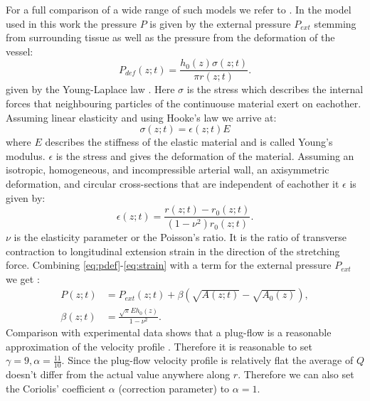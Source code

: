 \documentclass[a4paper, oneside]{discothesis}
\begin{document}
For a full comparison of a wide range of such models we refer to \cite{gomez2017analysis}.
In the model used in this work the pressure $P$ is given by the external pressure $P_{ext}$ stemming from surrounding tissue as well as the pressure from the deformation of the vessel:
\begin{equation}
	P_{def}(z;t) = \frac{h_0(z) \sigma(z;t)}{\pi r(z;t)}. \label{eq:pdef}
\end{equation}
given by the Young-Laplace law \cite{laplace1805traité} \cite{young1804essay}.
Here $\sigma$ is the stress which describes the internal forces that neighbouring particles of the continuouse material exert on eachother.
Assuming linear elasticity and using Hooke's law \cite{hooke1678lectures} we arrive at:
\begin{equation}
	\sigma(z;t) = \epsilon(z;t) E \label{eq:stress}
\end{equation}
where $E$ describes the stiffness of the elastic material and is called Young's modulus.
$\epsilon$ is the stress and gives the deformation of the material.
Assuming an isotropic, homogeneous, and incompressible arterial wall, an axisymmetric deformation, and circular cross-sections that are independent of eachother it $\epsilon$ is given by:
\begin{equation}
	\epsilon(z;t) = \frac{r(z;t)-r_0(z;t)}{ (1-\nu^2) r_0(z;t)}. \label{eq:strain}
\end{equation}
$\nu$ is the elasticity parameter or the Poisson's ratio.
It is the ratio of transverse contraction to longitudinal extension strain in the direction of the stretching force.
Combining \autoref{eq:pdef}-\autoref{eq:strain} with a term for the external pressure $P_{ext}$ we get \cite{sherwin2003one} \cite{sherwin2003computational}: 
\begin{align} 
	P(z;t) &= P_{ext}(z;t) + \beta \left( \sqrt{A(z;t)} - \sqrt{A_0(z)} \right),  \label{eq:p_tot}\\
	\beta(z;t) &=  \frac{\sqrt{\pi} E h_0(z)}{1-\nu^2}.
\end{align}
Comparison with experimental data shows that a plug-flow is a reasonable approximation of the velocity profile \cite{hunter1972numerical} \cite{smith2000generation} \cite{smith2002anatomically}.
Therefore it is reasonable to set $\gamma = 9, \alpha = \frac{11}{10}$.
Since the plug-flow velocity profile is relatively flat the average of $Q$ doesn't differ from the actual value anywhere along $r$.
Therefore we can also set the Coriolis' coefficient $\alpha$ (correction parameter) to $\alpha = 1$. \cite{formaggia2010cardiovascular}
\end{document}
